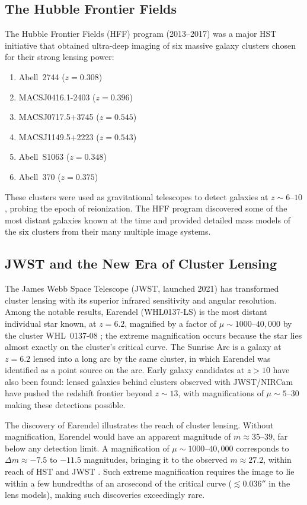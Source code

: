 \subsection{The Hubble Frontier Fields}

The Hubble Frontier Fields (HFF) program (2013--2017) was a major
HST initiative that obtained ultra-deep imaging of six massive
galaxy clusters chosen for their strong lensing power:
\begin{enumerate}[nosep]
    \item Abell~2744 ($z = 0.308$)
    \item MACSJ0416.1-2403 ($z = 0.396$)
    \item MACSJ0717.5+3745 ($z = 0.545$)
    \item MACSJ1149.5+2223 ($z = 0.543$)
    \item Abell~S1063 ($z = 0.348$)
    \item Abell~370 ($z = 0.375$)
\end{enumerate}
These clusters were used as gravitational telescopes to detect
galaxies at $z \sim 6$--$10$, probing the epoch of reionization.
The HFF program discovered some of the most distant galaxies known
at the time and provided detailed mass models of the six clusters
from their many multiple image systems.

\subsection{JWST and the New Era of Cluster Lensing}

The James Webb Space Telescope (JWST, launched 2021) has
transformed cluster lensing with its superior infrared sensitivity
and angular resolution.  Among the notable results, Earendel
(WHL0137-LS) is the most distant individual star known, at
$z = 6.2$, magnified by a factor of $\mu \sim 1000$--$40{,}000$ by
the cluster WHL~0137-08 \citep{welch_2022}; the extreme
magnification occurs because the star lies almost exactly on the
cluster's critical curve.  The Sunrise Arc is a galaxy at $z = 6.2$
lensed into a long arc by the same cluster, in which Earendel was
identified as a point source on the arc.  Early galaxy candidates at
$z > 10$ have also been found: lensed galaxies behind clusters
observed with JWST/NIRCam have pushed the redshift frontier beyond
$z \sim 13$, with magnifications of $\mu \sim 5$--$30$ making these
detections possible.

\begin{remark}
The discovery of Earendel illustrates the reach of cluster
lensing.  Without magnification, Earendel would have an apparent
magnitude of $m \approx 35$--$39$, far below any detection limit.  A
magnification of $\mu \sim 1000$--$40{,}000$ corresponds to
$\Delta m \approx -7.5$ to $-11.5$ magnitudes, bringing it to the observed
$m \approx 27.2$, within reach of HST and JWST \citep{welch_2022}.
Such extreme magnification requires the image to lie within a few
hundredths of an arcsecond of the critical curve ($\lesssim 0.036''$ in
the \citet{welch_2022} lens models), making such discoveries exceedingly
rare.
\end{remark}


